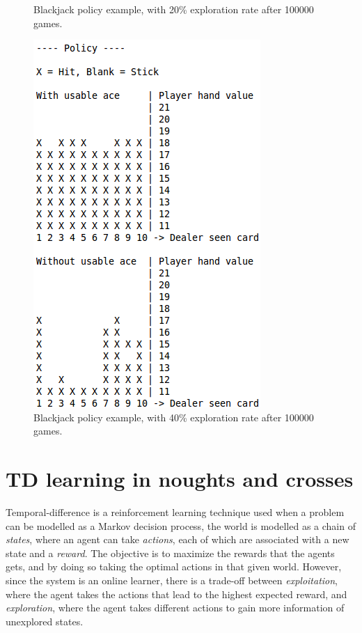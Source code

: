 \documentclass[12pt]{article}
\begin{document}
\begin{figure}[htbp!]
\begin{minipage}[t]{0.3\linewidth}
	\caption{Blackjack policy example, with 20\% exploration rate after 100000 games.}
	\label{fig:blackjack_0_2_Q}
\end{minipage}
\quad
\begin{minipage}[t]{0.3\linewidth}
	\includegraphics[scale=0.35]{images/blackjack_0_4_Q}
	\caption{Blackjack policy example, with 40\% exploration rate after 100000 games.}
	\label{fig:blackjack_0_4_Q}
\end{minipage}
\end{figure}

\section{TD learning in noughts and crosses}
\label{sec:td_ttt}

Temporal-difference is a reinforcement learning technique used when a problem can be modelled as a Markov decision process, the world is modelled as a chain of \emph{states}, where an agent can take \emph{actions}, each of which are associated with a new state and a \emph{reward}.
The objective is to maximize the rewards that the agents gets, and by doing so taking the optimal actions in that given world.
However, since the system is an online learner, there is a trade-off between \emph{exploitation}, where the agent takes the actions that lead to the highest expected reward, and \emph{exploration}, where the agent takes different actions to gain more information of unexplored states.
\end{document}
